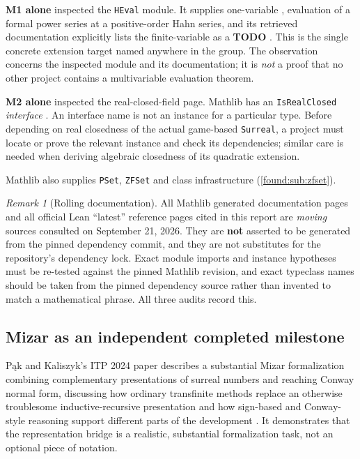 \documentclass[11pt,letterpaper]{article}
\numberwithin{equation}{section}
\theoremstyle{definition}
\theoremstyle{remark}
\newtheorem{remark}[theorem]{Remark}
\begin{document}
\textbf{M1 alone} inspected the \texttt{HEval} module. It supplies one-variable
, evaluation of a formal power series at a
positive-order Hahn series, and its retrieved documentation explicitly lists the
finite-variable  as a \textbf{TODO}
\cite{found:MathlibHEval}. This is the single concrete extension target named
anywhere in the group. The observation concerns the inspected module and its
documentation; it is \emph{not} a proof that no other project contains a
multivariable evaluation theorem.

\textbf{M2 alone} inspected the real-closed-field page. Mathlib has an
\texttt{IsRealClosed} \emph{interface} \cite{found:MathlibRealClosed}. An
interface name is not an instance for a particular type. Before depending on real
closedness of the actual game-based \texttt{Surreal}, a project must locate or
prove the relevant instance and check its dependencies; similar care is needed
when deriving algebraic closedness of its quadratic extension.

Mathlib also supplies \texttt{PSet}, \texttt{ZFSet} and class infrastructure
(\cref{found:sub:zfset}).

\begin{remark}[Rolling documentation]\label{found:rem:rolling}
All Mathlib generated documentation pages and all official Lean ``latest''
reference pages cited in this report are \emph{moving} sources consulted on
September 21, 2026. They are \textbf{not} asserted to be generated from the
pinned dependency commit, and they are not substitutes for the repository's
dependency lock. Exact module imports and instance hypotheses must be re-tested
against the pinned Mathlib revision, and exact typeclass names should be taken
from the pinned dependency source rather than invented to match a mathematical
phrase. All three audits record this.
\end{remark}

\subsection{Mizar as an independent completed milestone}
\label{found:sub:mizar}
P\k{a}k and Kaliszyk's ITP 2024 paper describes a substantial Mizar formalization
combining complementary presentations of surreal numbers and reaching Conway
normal form, discussing how ordinary transfinite methods replace an otherwise
troublesome inductive-recursive presentation and how sign-based and Conway-style
reasoning support different parts of the development
\cite{found:PakKaliszyk}. It demonstrates that the representation bridge is a
realistic, substantial formalization task, not an optional piece of notation.
\end{document}

